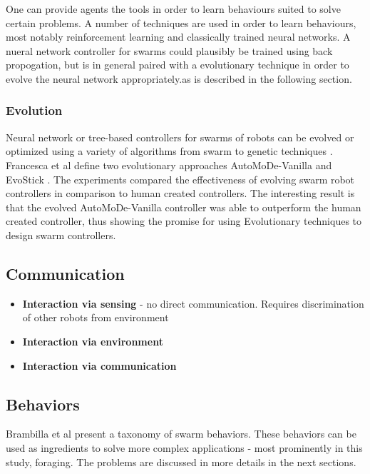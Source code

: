 One can provide agents the tools in order to learn behaviours suited to solve certain problems. A number of techniques are used in order to learn behaviours, most notably reinforcement learning and classically trained neural networks. A nueral network controller for swarms could plausibly be trained using back propogation, but is in general paired with a evolutionary technique in order to evolve the neural network appropriately.as is described in the following section. 

\subsubsection{Evolution}
Neural network or tree-based controllers for swarms of robots can be evolved or optimized using a variety of algorithms from swarm to genetic techniques \cite{baldassarre2003evolving, tuci2014evolutionary}. Francesca et al define two evolutionary approaches AutoMoDe-Vanilla and EvoStick \cite{francesca2014automode,francesca2014experiment}. The experiments compared the effectiveness of evolving swarm robot controllers in comparison to human created controllers. The interesting result is that the evolved AutoMoDe-Vanilla controller was able to outperform the human created controller, thus showing the promise for using Evolutionary techniques to design swarm controllers.

\subsection{Communication}

\begin{itemize}
	\item \textbf{Interaction via sensing} - no direct communication. Requires discrimination of other robots from environment
	\item \textbf{Interaction via environment}
	\item \textbf{Interaction via communication}
\end{itemize}

\subsection{Behaviors}
\label{swarmrobotapplications}

Brambilla et al \cite{brambilla2013swarm} present a taxonomy of swarm behaviors. These behaviors can be used as ingredients to solve more complex applications - most prominently in this study, foraging. The problems are discussed in more details in the next sections.

